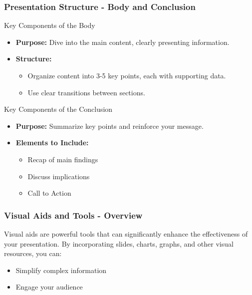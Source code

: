 \documentclass{beamer}
\begin{document}
\begin{frame}[fragile]
    \frametitle{Presentation Structure - Body and Conclusion}
    \begin{block}{Key Components of the Body}
        \begin{itemize}
            \item \textbf{Purpose:} Dive into the main content, clearly presenting information.
            \item \textbf{Structure:}
            \begin{itemize}
                \item Organize content into 3-5 key points, each with supporting data.
                \item Use clear transitions between sections.
            \end{itemize}
        \end{itemize}
    \end{block}
    
    \begin{block}{Key Components of the Conclusion}
        \begin{itemize}
            \item \textbf{Purpose:} Summarize key points and reinforce your message.
            \item \textbf{Elements to Include:}
            \begin{itemize}
                \item Recap of main findings
                \item Discuss implications
                \item Call to Action
            \end{itemize}
        \end{itemize}
    \end{block}
\end{frame}

\begin{frame}[fragile]
    \frametitle{Visual Aids and Tools - Overview}
    Visual aids are powerful tools that can significantly enhance the effectiveness of your presentation. 
    By incorporating slides, charts, graphs, and other visual resources, you can:
    \begin{itemize}
        \item Simplify complex information
        \item Engage your audience
    \end{itemize}
\end{frame}
\end{document}
